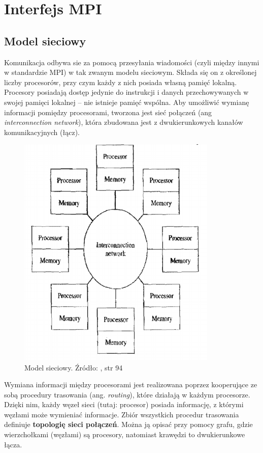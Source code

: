 \section{Interfejs MPI}

\subsection{Model sieciowy}

Komunikacja odbywa sie za pomocą przesyłania wiadomości (czyli między innymi w standardzie MPI) w tak zwanym modelu sieciowym. Składa się on z określonej liczby procesorów, przy czym każdy z nich posiada własną pamięć lokalną. Procesory posiadają dostęp jedynie do instrukcji i danych przechowywanych w swojej pamięci lokalnej -- nie istnieje pamięć wspólna. Aby umożliwić wymianę informacji pomiędzy procesorami, tworzona jest sieć połączeń (ang \textit{interconnection network}), która zbudowana jest z dwukierunkowych kanałów komunikacyjnych (łącz). 

\begin{figure}[h]
	\centering
	\includegraphics[width=0.85\textwidth]{./img/sieciowy.png}
	\caption{Model sieciowy. Źródło: \cite{Parallel}, str 94}
	\label{img:sieć}
\end{figure}

Wymiana informacji między procesorami jest realizowana poprzez kooperujące ze sobą procedury trasowania (ang. \textit{routing}), które działają w każdym procesorze. Dzięki nim, każdy węzeł sieci (tutaj: procesor) posiada informację, z którymi węzłami może wymieniać informacje. Zbiór wszystkich procedur trasowania definiuje \textbf{topologię sieci połączeń}. Można ją opisać przy pomocy grafu, gdzie wierzchołkami (węzłami) są procesory, natomiast krawędzi to dwukierunkowe łącza.

